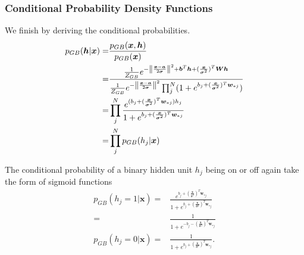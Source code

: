 \documentclass[twoside,english]{uiofysmaster}
\DeclarePairedDelimiter{\norm}{\lVert}{\rVert}
\begin{document}
\subsubsection{Conditional Probability Density Functions}
We finish by deriving the conditional probabilities. 
\begin{align}
	p_{GB} (\bm{h}| \bm{x}) =& \frac{p_{GB} (\bm{x}, \bm{h})}{p_{GB} (\bm{x})} \nonumber \\
	=& \frac{\frac{1}{Z_{GB}} e^{-\norm*{\frac{\bm{x} -\bm{a}}{2\bm{\sigma}}}^2 + \bm{b}^T \bm{h} 
	+ (\frac{\bm{x}}{\bm{\sigma}^2})^T \bm{W}\bm{h}}}
	{\frac{1}{Z_{GB}} e^{-\norm*{\frac{\bm{x} -\bm{a}}{2\bm{\sigma}}}^2}
	\prod_j^N (1 + e^{b_j + (\frac{\bm{x}}{\bm{\sigma}^2})^T \bm{w}_{\ast j}} ) }
	\nonumber \\
	=& \prod_j^N \frac{e^{(b_j + (\frac{\bm{x}}{\bm{\sigma}^2})^T \bm{w}_{\ast j})h_j } }
	{1 + e^{b_j + (\frac{\bm{x}}{\bm{\sigma}^2})^T \bm{w}_{\ast j}}} \nonumber \\
	=& \prod_j^N p_{GB} (h_j|\bm{x})
\end{align}

The conditional probability of a binary hidden unit $h_j$ being on or off again take the form of sigmoid functions
\begin{align}
	p_{GB} (h_j =1 | \bm{x}) =& \frac{e^{b_j + (\frac{\bm{x}}{\bm{\sigma}^2})^T \bm{w}_{\ast j} } }
	{1 + e^{b_j + (\frac{\bm{x}}{\bm{\sigma}^2})^T \bm{w}_{\ast j}}} \nonumber \\
	=& \frac{1}{1 + e^{-b_j - (\frac{\bm{x}}{\bm{\sigma}^2})^T \bm{w}_{\ast j}}} \\
	p_{GB} (h_j =0 | \bm{x}) =&
	\frac{1}{1 + e^{b_j +(\frac{\bm{x}}{\bm{\sigma}^2})^T \bm{w}_{\ast j}}} .
\end{align}
\end{document}
